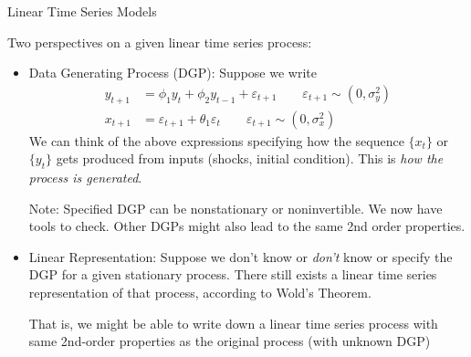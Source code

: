 \documentclass[handout]{beamer}
\newcommand{\Var}{\operatorname{Var}}
\begin{document}
\begin{frame}[shrink]{Linear Time Series Models}

Two perspectives on a given linear time series process:
\begin{itemize}
  \item \alert{Data Generating Process (DGP)}:
    Suppose we write
    \begin{align*}
      y_{t+1} &= \phi_1 y_{t} + \phi_2 y_{t-1} + \varepsilon_{t+1}
      \qquad
      \varepsilon_{t+1} \sim (0,\sigma^2_y)
      \\
      x_{t+1} &= \varepsilon_{t+1} + \theta_1\varepsilon_{t}
      \qquad
      \varepsilon_{t+1} \sim (0,\sigma^2_x)
    \end{align*}
    We can think of the above expressions specifying how the sequence
    $\{x_t\}$ or $\{y_t\}$ gets produced from inputs (shocks, initial
    condition).
    This is \emph{how the process is generated}.

    Note: Specified DGP can be nonstationary or noninvertible.
    We now have tools to check.
    Other DGPs might also lead to the same 2nd order properties.

  \pause
  \item \alert{Linear Representation}:
    Suppose we don't know or \emph{don't} know or specify the DGP for a
    given stationary process.
    There still exists a linear time series representation of that
    process, according to Wold's Theorem.

    That is, we might be able to write down a linear time series process
    with same 2nd-order properties as the original process (with
    unknown DGP)
\end{itemize}
\end{frame}


\end{document}

